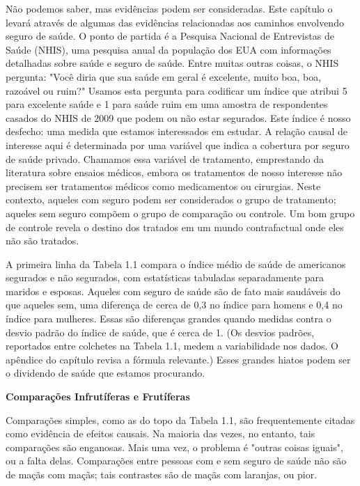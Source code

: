 \documentclass[a4paper,12pt]{article}[abntex2]
\begin{document}
Não podemos saber, mas evidências podem ser consideradas. Este capítulo o levará através de algumas das evidências relacionadas aos caminhos envolvendo seguro de saúde. O ponto de partida é a Pesquisa Nacional de Entrevistas de Saúde (NHIS), uma pesquisa anual da população dos EUA com informações detalhadas sobre saúde e seguro de saúde. Entre muitas outras coisas, o NHIS pergunta: "Você diria que sua saúde em geral é excelente, muito boa, boa, razoável ou ruim?" Usamos esta pergunta para codificar um índice que atribui 5 para excelente saúde e 1 para saúde ruim em uma amostra de respondentes casados do NHIS de 2009 que podem ou não estar segurados. Este índice é nosso desfecho: uma medida que estamos interessados em estudar. A relação causal de interesse aqui é determinada por uma variável que indica a cobertura por seguro de saúde privado. Chamamos essa variável de tratamento, emprestando da literatura sobre ensaios médicos, embora os tratamentos de nosso interesse não precisem ser tratamentos médicos como medicamentos ou cirurgias. Neste contexto, aqueles com seguro podem ser considerados o grupo de tratamento; aqueles sem seguro compõem o grupo de comparação ou controle. Um bom grupo de controle revela o destino dos tratados em um mundo contrafactual onde eles não são tratados.

A primeira linha da Tabela 1.1 compara o índice médio de saúde de americanos segurados e não segurados, com estatísticas tabuladas separadamente para maridos e esposas. Aqueles com seguro de saúde são de fato mais saudáveis do que aqueles sem, uma diferença de cerca de 0,3 no índice para homens e 0,4 no índice para mulheres. Essas são diferenças grandes quando medidas contra o desvio padrão do índice de saúde, que é cerca de 1. (Os desvios padrões, reportados entre colchetes na Tabela 1.1, medem a variabilidade nos dados. O apêndice do capítulo revisa a fórmula relevante.) Esses grandes hiatos podem ser o dividendo de saúde que estamos procurando.

\textbf{Comparações Infrutíferas e Frutíferas}

Comparações simples, como as do topo da Tabela 1.1, são frequentemente citadas como evidência de efeitos causais. Na maioria das vezes, no entanto, tais comparações são enganosas. Mais uma vez, o problema é "outras coisas iguais", ou a falta delas. Comparações entre pessoas com e sem seguro de saúde não são de maçãs com maçãs; tais contrastes são de maçãs com laranjas, ou pior.
\end{document}
